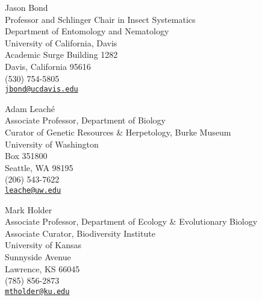 Jason Bond \\
\myIndent Professor and Schlinger Chair in Insect Systematics \\
\myIndent Department of Entomology and Nematology \\
\myIndent University of California, Davis \\
\myIndent Academic Surge Building 1282 \\
\myIndent Davis, California 95616 \\
\myIndent (530) 754-5805 \\
\myIndent \href{mailto:jbond@ucdavis.edu}{\tt jbond@ucdavis.edu}



Adam Leach\'{e} \\
\myIndent Associate Professor, Department of Biology \\
\myIndent Curator of Genetic Resources \& Herpetology, Burke Museum \\
\myIndent University of Washington \\
\myIndent Box 351800 \\
\myIndent Seattle, WA 98195\\
\myIndent (206) 543-7622 \\
\myIndent \href{mailto:leache@uw.edu}{\tt leache@uw.edu}

Mark Holder \\
\myIndent Associate Professor, Department of Ecology \& Evolutionary Biology \\
\myIndent Associate Curator, Biodiversity Institute \\
\myIndent University of Kansas \\
 Sunnyside Avenue \\
\myIndent Lawrence, KS 66045 \\
\myIndent (785) 856-2873 \\
\myIndent \href{mailto:mtholder@ku.edu}{\tt mtholder@ku.edu}

